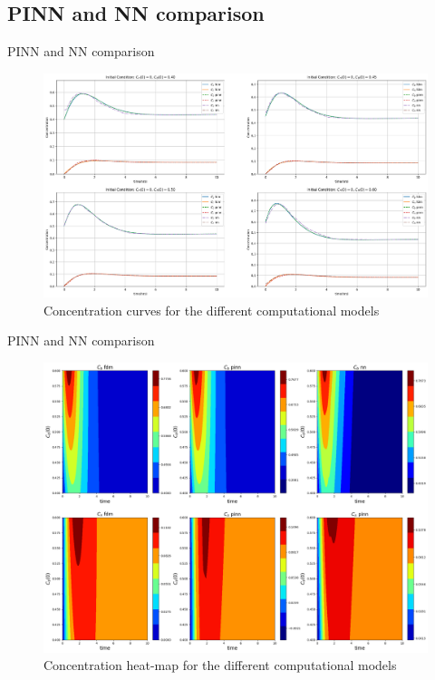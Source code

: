 \documentclass[serif,8pt, aspectratio=169]{beamer}
\begin{document}
\subsection{PINN and NN comparison}
\begin{frame}[fragile]{PINN and NN comparison}

    \begin{figure}
        \centering
        \includegraphics[width=0.77\linewidth]{pic/conc_curve_plot.png}
        \caption{Concentration curves for the different computational models}
        \label{fig:enter-label}
    \end{figure}

\end{frame}

\begin{frame}[fragile]{PINN and NN comparison}
    \begin{figure}
        \centering
        \includegraphics[width=0.6\linewidth]{pic/conc_heat_plot.png}
        \caption{Concentration heat-map for the different computational models}
        \label{fig:enter-label}
    \end{figure}
\end{frame}
\end{document}

